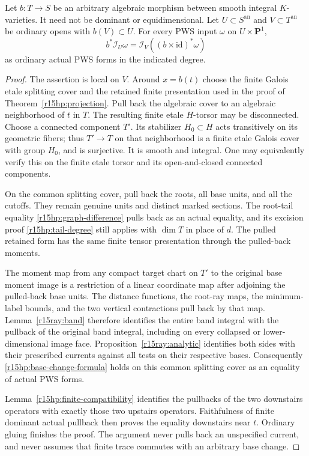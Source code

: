 \begin{proposition}
\label{r15hp:base-change}
Let $b:T\to S$ be an arbitrary algebraic morphism between smooth
integral $K$-varieties.  It need not be dominant or equidimensional.
Let $U\subset S^{\mathrm{an}}$ and $V\subset T^{\mathrm{an}}$
be ordinary opens with $b(V)\subset U$.  For every PWS input
$\omega$ on $U\times\mathbf P^1$,
\[
 b^*\mathcal I_U\omega
       =\mathcal I_V((b\times\mathrm{id})^*\omega)
\tag{HP15.13}\label{r15hp:base-change-formula}
\]
as ordinary actual PWS forms in the indicated degree.
\end{proposition}

\begin{proof}
The assertion is local on $V$.  Around $x=b(t)$ choose the
finite Galois etale splitting cover and the retained finite
presentation used in the proof of Theorem~\ref{r15hp:projection}.
Pull back the algebraic cover to an algebraic neighborhood of
$t$ in $T$.  The resulting finite etale $H$-torsor may be
disconnected.  Choose a connected component $T'$.  Its stabilizer
$H_0\subset H$ acts transitively on its geometric fibers; thus
$T'\to T$ on that neighborhood is a finite etale Galois cover
with group $H_0$, and is surjective.  It is smooth and integral.
One may equivalently verify this on the finite etale torsor and
its open-and-closed connected components.

On the common splitting cover, pull back the roots, all base
units, and all the cutoffs.  They remain genuine units and
distinct marked sections.  The root-tail equality
\eqref{r15hp:graph-difference} pulls back as an actual equality,
and its excision proof \eqref{r15hp:tail-degree} still applies
with $\dim T$ in place of $d$.  The pulled retained form has the
same finite tensor presentation through the pulled-back moments.

The moment map from any compact target chart on $T'$ to the
original base moment image is a restriction of a linear
coordinate map after adjoining the pulled-back base units.
The distance functions, the root-ray maps, the minimum-label
bounds, and the two vertical contractions pull back by that map.
Lemma~\ref{r15ray:band} therefore identifies the entire band
integral with the pullback of the original band integral,
including on every collapsed or lower-dimensional image face.
Proposition~\ref{r15ray:analytic} identifies both sides with
their prescribed currents against all tests on their respective
bases.  Consequently \eqref{r15hp:base-change-formula} holds on
this common splitting cover as an equality of actual PWS forms.

Lemma~\ref{r15hp:finite-compatibility} identifies the pullbacks
of the two downstairs operators with exactly those two
upstairs operators.  Faithfulness of finite dominant actual
pullback then proves the equality downstairs near $t$.
Ordinary gluing finishes the proof.  The argument never pulls
back an unspecified current, and never assumes that finite trace
commutes with an arbitrary base change.
\end{proof}

